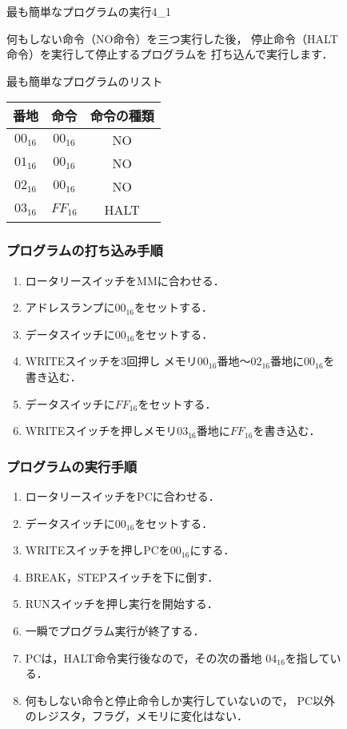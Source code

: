 \begin{figure}[tb]
  \begin{rei}{最も簡単なプログラムの実行}{4_1}

    何もしない命令（NO命令）を三つ実行した後，
    停止命令（HALT命令）を実行して停止するプログラムを
    打ち込んで実行します．

    {\ttfamily\small\begin{center}
      最も簡単なプログラムのリスト
      \begin{tabular}{|c|c|c|} \hline
        番地 & 命令 & 命令の種類\\
        \hline
        $00_{16}$ & $00_{16}$ & NO \\
        $01_{16}$ & $00_{16}$ & NO \\
        $02_{16}$ & $00_{16}$ & NO \\
        $03_{16}$ & $FF_{16}$ & HALT \\
        \hline
      \end{tabular}
    \end{center}}

    \subsubsection{プログラムの打ち込み手順}

    \begin{enumerate}
    \item ロータリースイッチをMMに合わせる．
    \item アドレスランプに$00_{16}$をセットする．
    \item データスイッチに$00_{16}$をセットする．
    \item WRITEスイッチを3回押し
      メモリ$00_{16}$番地〜$02_{16}$番地に$00_{16}$を書き込む．
    \item データスイッチに$FF_{16}$をセットする．
    \item WRITEスイッチを押しメモリ$03_{16}$番地に$FF_{16}$を書き込む．
    \end{enumerate}

    \subsubsection{プログラムの実行手順}

    \begin{enumerate}
    \item ロータリースイッチをPCに合わせる．
    \item データスイッチに$00_{16}$をセットする．
    \item WRITEスイッチを押しPCを$00_{16}$にする．
    \item BREAK，STEPスイッチを下に倒す．
    \item RUNスイッチを押し実行を開始する．
    \item 一瞬でプログラム実行が終了する．
    \item PCは，HALT命令実行後なので，その次の番地 $04_{16}$を指している．
    \item 何もしない命令と停止命令しか実行していないので，
      PC以外のレジスタ，フラグ，メモリに変化はない．
    \end{enumerate}


\end{rei}
\end{figure}
